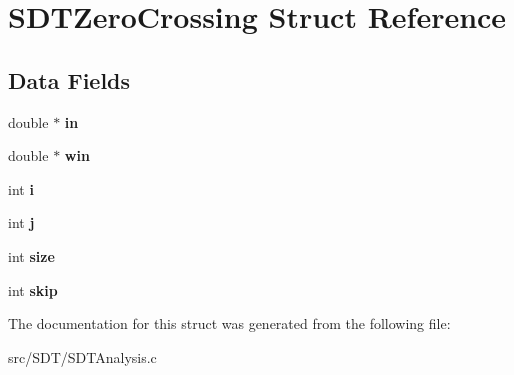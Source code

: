 \hypertarget{struct_s_d_t_zero_crossing}{}\section{S\+D\+T\+Zero\+Crossing Struct Reference}
\label{struct_s_d_t_zero_crossing}
\subsection*{Data Fields}
\begin{DoxyCompactItemize}
\item 
\hypertarget{struct_s_d_t_zero_crossing_a88b879aa32e1373f5e19154d3d583fd3}{}double $\ast$ {\bfseries in}\label{struct_s_d_t_zero_crossing_a88b879aa32e1373f5e19154d3d583fd3}

\item 
\hypertarget{struct_s_d_t_zero_crossing_a0db7743ca63ebec1838ca74753ac8894}{}double $\ast$ {\bfseries win}\label{struct_s_d_t_zero_crossing_a0db7743ca63ebec1838ca74753ac8894}

\item 
\hypertarget{struct_s_d_t_zero_crossing_acb559820d9ca11295b4500f179ef6392}{}int {\bfseries i}\label{struct_s_d_t_zero_crossing_acb559820d9ca11295b4500f179ef6392}

\item 
\hypertarget{struct_s_d_t_zero_crossing_a37d972ae0b47b9099e30983131d31916}{}int {\bfseries j}\label{struct_s_d_t_zero_crossing_a37d972ae0b47b9099e30983131d31916}

\item 
\hypertarget{struct_s_d_t_zero_crossing_a439227feff9d7f55384e8780cfc2eb82}{}int {\bfseries size}\label{struct_s_d_t_zero_crossing_a439227feff9d7f55384e8780cfc2eb82}

\item 
\hypertarget{struct_s_d_t_zero_crossing_a13f77b252237844d7b8b6e3c3047fe50}{}int {\bfseries skip}\label{struct_s_d_t_zero_crossing_a13f77b252237844d7b8b6e3c3047fe50}

\end{DoxyCompactItemize}


The documentation for this struct was generated from the following file\+:\begin{DoxyCompactItemize}
\item 
src/\+S\+D\+T/S\+D\+T\+Analysis.\+c\end{DoxyCompactItemize}
